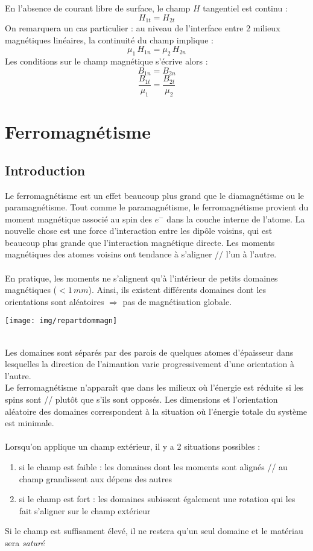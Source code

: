 \documentclass	[11pt, a4paper, openany]{book}
\begin{document}
En l'absence de courant libre de surface, le champ $H$ tangentiel est continu : 
\begin{equation}
H_{1t}=H_{2t}
\end{equation}
On remarquera un cas particulier : au niveau de l'interface entre 2 milieux magnétiques linéaires, la continuité du champ implique :
\begin{equation}
\mu_1\, H_{1n}=\mu_2\, H_{2n}
\end{equation}
Les conditions sur le champ magnétique s'écrive alors : 
$$
B_{1n}=B_{2n}$$ $$
\frac{B_{1t}}{\mu_1}=\frac{B_{2t}}{\mu_2}
$$
\section{Ferromagnétisme}
\subsection{Introduction}
Le ferromagnétisme est un effet beaucoup plus grand que le diamagnétisme ou le paramagnétisme. Tout comme le paramagnétisme, le ferromagnétisme provient du moment magnétique associé au spin des $e^-$ dans la couche interne de l'atome. La nouvelle chose est une force d'interaction entre les dipôle voisins, qui est beaucoup plus grande que l'interaction magnétique directe. Les moments magnétiques des atomes voisins ont tendance à s'aligner // l'un à l'autre.\\\\
En pratique, les moments ne s'alignent qu'à l'intérieur de petits domaines magnétiques ($<1\,mm$). Ainsi, ils existent différents domaines dont les orientations sont aléatoires $\Rightarrow$ pas de magnétisation globale.
\begin{center}
\texttt{[image: img/repartdommagn]}
\end{center}\ \\
Les domaines sont séparés par des parois de quelques atomes d'épaisseur dans lesquelles la direction de l'aimantion varie progressivement d'une orientation à l'autre.\\

Le ferromagnétisme n'apparaît que dans les milieux où l'énergie est réduite si les spins sont // plutôt que s'ils sont opposés. Les dimensions et l'orientation aléatoire des domaines correspondent à la situation où l'énergie totale du système est minimale.\\\\
Lorsqu'on applique un champ extérieur, il y a 2 situations possibles :\begin{enumerate}
\item si le champ est faible : les domaines dont les moments sont alignés // au champ grandissent aux dépens des autres
\item si le champ est fort : les domaines subissent également une rotation qui les fait s'aligner sur le champ extérieur
\end{enumerate}
Si le champ est suffisament élevé, il ne restera qu'un seul domaine et le matériau sera \textit{saturé}
\end{document}

